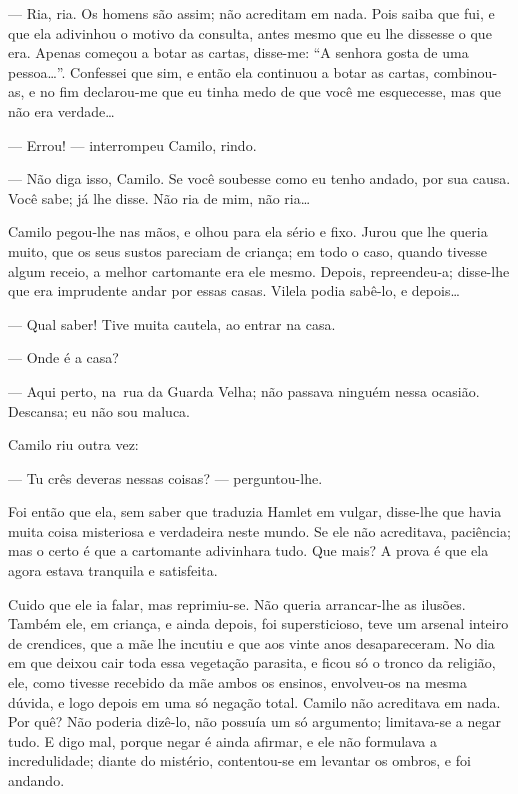 --- Ria, ria. Os homens são assim; não acreditam em nada. Pois saiba que
fui, e que ela adivinhou o motivo da consulta, antes mesmo que eu lhe
dissesse o que era. Apenas começou a botar as cartas, disse-me: ``A
senhora gosta de uma pessoa\ldots''. Confessei que sim, e então ela
continuou a botar as cartas, combinou-as, e no fim declarou-me que eu
tinha medo de que você me esquecesse, mas que não era verdade\ldots{}

--- Errou! --- interrompeu Camilo, rindo.

--- Não diga isso, Camilo. Se você soubesse como eu tenho andado, por
sua causa. Você sabe; já lhe disse. Não ria de mim, não ria\ldots{}

Camilo pegou-lhe nas mãos, e olhou para ela sério e fixo. Jurou que lhe
queria muito, que os seus sustos pareciam de criança; em todo o caso,
quando tivesse algum receio, a melhor cartomante era ele mesmo. Depois,
repreendeu-a; disse-lhe que era imprudente andar por essas casas. Vilela
podia sabê-lo, e depois\ldots{}

--- Qual saber! Tive muita cautela, ao entrar na casa.

--- Onde é a casa?

--- Aqui perto, na~rua da Guarda Velha; não passava ninguém nessa
ocasião. Descansa; eu não sou maluca.

Camilo riu outra vez:

--- Tu crês deveras nessas coisas? --- perguntou-lhe.

Foi então que ela, sem saber que traduzia Hamlet em vulgar, disse-lhe
que havia muita coisa misteriosa e verdadeira neste mundo. Se ele não
acreditava, paciência; mas o certo é que a cartomante adivinhara tudo.
Que mais? A prova é que ela agora estava tranquila e satisfeita.

Cuido que ele ia falar, mas reprimiu-se. Não queria arrancar-lhe as
ilusões. Também ele, em criança, e ainda depois, foi supersticioso, teve
um arsenal inteiro de crendices, que a mãe lhe incutiu e que aos vinte
anos desapareceram. No dia em que deixou cair toda essa vegetação
parasita, e ficou só o tronco da religião, ele, como tivesse recebido da
mãe ambos os ensinos, envolveu-os na mesma dúvida, e logo depois em uma
só negação total. Camilo não acreditava em nada. Por quê? Não poderia
dizê-lo, não possuía um só argumento; limitava-se a negar tudo. E digo
mal, porque negar é ainda afirmar, e ele não formulava a incredulidade;
diante do mistério, contentou-se em levantar os ombros, e foi andando.

